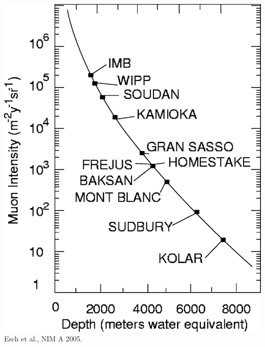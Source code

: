 \documentclass{beamer}
\begin{document}
\begin{frame}
\begin{columns}[onlytextwidth]
\begin{column}{.5\textwidth}
\includegraphics[keepaspectratio=true,width=\textwidth]{muonflux.eps}\\
\tiny Esch et al., NIM A 2005.
\end{column}
\end{columns}
\end{frame}
\end{document}

